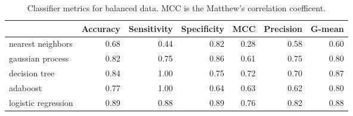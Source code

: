 \begin{table}[H]
\centering
\caption{Classifier metrics for balanced data. MCC is the Matthew’s correlation coefficent.}
\label{tbl:mordred_features}
\begin{tabular}{lrrrrrr}
\toprule
{} &  Accuracy &  Sensitivity &  Specificity &  MCC &  Precision &  G-mean \\
\midrule
nearest neighbors   &      0.68 &         0.44 &         0.82 & 0.28 &       0.58 &    0.60 \\
gaussian process    &      0.82 &         0.75 &         0.86 & 0.61 &       0.75 &    0.80 \\
decision tree       &      0.84 &         1.00 &         0.75 & 0.72 &       0.70 &    0.87 \\
adaboost            &      0.77 &         1.00 &         0.64 & 0.63 &       0.62 &    0.80 \\
logistic regression &      0.89 &         0.88 &         0.89 & 0.76 &       0.82 &    0.88 \\
\bottomrule
\end{tabular}
\end{table}
